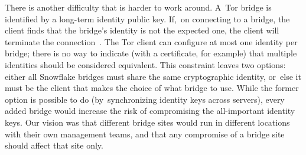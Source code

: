 \documentclass[letterpaper,twocolumn]{article}
\begin{document}
There is another difficulty that is harder to work around.
A~Tor bridge is identified
by a long-term identity public key.
If,~on connecting to a bridge,
the client finds that the bridge's identity is not the expected one,
the client will terminate the connection~\cite[\S 4.2]{tor-spec}.
The Tor client can configure at most one identity per bridge;
there is no way to indicate (with a certificate, for example)
that multiple identities should be considered equivalent.
This constraint leaves two options:
either all Snowflake bridges must share the same cryptographic identity,
or~else it must be the client that makes the choice of what bridge to use.
While the former option is possible to do
(by~synchronizing identity keys across servers),
every added bridge would increase the risk of compromising
the all-important identity keys.
Our vision was that different bridge sites
would run in different locations
with their own management teams,
and that any compromise of a bridge site
should affect that site only.
\end{document}
